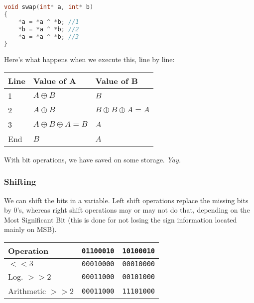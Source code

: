 \documentclass{article}
\newcommand{\ms}[1]{\texttt{#1}}
\begin{document}
\begin{center}
\centering
\begin{lstlisting}[language=C]
void swap(int* a, int* b)
{
	*a = *a ^ *b; //1
	*b = *a ^ *b; //2
	*a = *a ^ *b; //3
}
\end{lstlisting}
\end{center}
Here's what happens when we execute this, line by line:\\
\begin{center}
\begin{table}[ht!]
\centering
\begin{tabular}{|l|l|l|}
\hline
Line & Value of A                     & Value of B                     \\ \hline
1    & \ms{$A \oplus B$}              & \ms{$B$}                       \\ \hline
2    & \ms{$A \oplus B$}              & \ms{$B \oplus B \oplus A = A$} \\ \hline
3    & \ms{$A \oplus B \oplus A = B$} & \ms{$A$}                       \\ \hline
End  & \ms{$B$}                         & \ms{$A$}                         \\ \hline
\end{tabular}
\end{table}
\end{center}
With bit operations, we have saved on some storage. \textit{Yay.}
\subsubsection{Shifting}
We can shift the bits in a variable. Left shift operations replace the missing bits by 0's, whereas right shift operations may or may not do that, depending on the Most Significant Bit (this is done for not losing the sign information located mainly on MSB).\\
\begin{center}
\begin{table}[ht!]
\centering
\begin{tabular}{|l|l|l|}
\hline
Operation        & \ms{01100010} & \ms{10100010} \\ \hline
$<<3$            & \ms{00010000} & \ms{00010000} \\ \hline
Log. $>>2$       & \ms{00011000} & \ms{00101000} \\ \hline
Arithmetic $>>2$ & \ms{00011000} & \ms{11101000} \\ \hline
\end{tabular}
\end{table}
\end{center}
\end{document}
